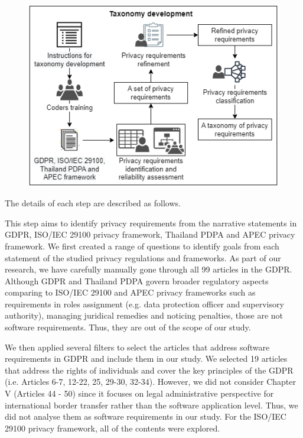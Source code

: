 \begin{figure}
	\centering
	\includegraphics[width=1\linewidth]{"Figures/Taxonomy-development"}
	\caption{}
	\label{fig:taxonomy development}
\end{figure}

The details of each step are described as follows.
 \label{subsec:req-identification}

This step aims to identify privacy requirements from the narrative statements in GDPR, ISO/IEC 29100 privacy framework, Thailand PDPA and APEC privacy framework. We first created a range of questions to identify goals from each statement of the studied privacy regulations and frameworks. As part of our research, we have carefully manually gone through all 99 articles in the GDPR. Although GDPR and Thailand PDPA govern broader regulatory aspects comparing to ISO/IEC 29100 and APEC privacy frameworks such as requirements in roles assignment (e.g. data protection officer and supervisory authority), managing juridical remedies and noticing penalties, those are not software requirements. Thus, they are out of the scope of our study. 

We then applied several filters to select the articles that address software requirements in GDPR and include them in our study. We selected 19 articles that address the rights of individuals and cover the key principles of the GDPR (i.e. Articles 6-7, 12-22, 25, 29-30, 32-34). However, we did not consider Chapter V (Articles 44 - 50) since it focuses on legal administrative perspective for international border transfer rather than the software application level. Thus, we did not analyse them as software requirements in our study. For the ISO/IEC 29100 privacy framework, all of the contents were explored.

